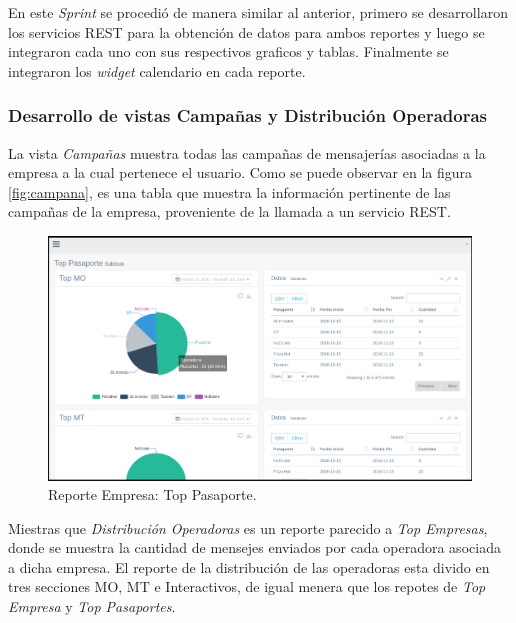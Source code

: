 

\indent En este \textit{Sprint} se procedió de manera similar al anterior, primero se desarrollaron los servicios REST para la obtención de datos para ambos reportes y luego se integraron cada uno con sus respectivos graficos y tablas. Finalmente se integraron los \textit{widget} calendario en cada reporte.


\subsubsection{Desarrollo de vistas Campañas y Distribución Operadoras}
\indent La vista \textit{Campañas} muestra todas las campañas de mensajerías asociadas a la empresa a la cual pertenece el usuario. Como se puede observar en la figura \ref{fig:campana}, es una tabla que muestra la información pertinente de las campañas de la empresa, proveniente de la llamada a un servicio REST.
\begin{figure}[ht]
  \centering
  \includegraphics[scale=0.30,type=png,ext=.png,read=.png]{imagenes/retp}
  \caption{Reporte Empresa: Top Pasaporte.}
  \label{fig:retp}
\end{figure}
\newline
\newline
\indent Miestras que \textit{Distribución Operadoras} es un reporte parecido a \textit{Top Empresas}, donde se muestra la cantidad de mensejes enviados por cada operadora asociada a dicha empresa. El reporte de la distribución de las operadoras esta divido en tres secciones MO, MT e Interactivos, de igual menera que los repotes de \textit{Top Empresa} y \textit{Top Pasaportes}.
